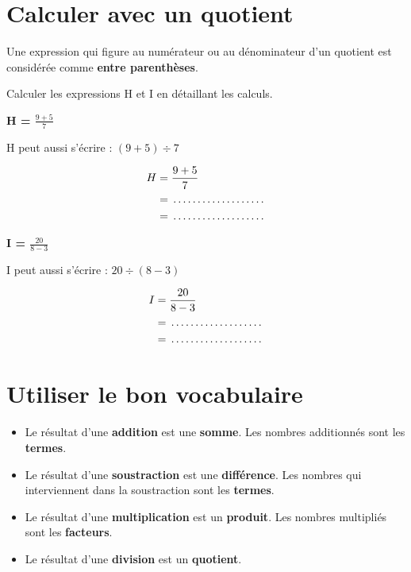 \newpage
\section{Calculer avec un quotient}
\raggedbottom
\begin{proprietebox}
Une expression qui figure au numérateur ou au dénominateur d'un quotient est considérée comme \textbf{entre parenthèses}.
\end{proprietebox}

\begin{examplebox}
Calculer les expressions H et I en détaillant les calculs.

\begin{minipage}{0.48\textwidth}
\textbf{H = $\frac{9 + 5}{7}$}

H peut aussi s'écrire : $(9 + 5) \div 7$

\begin{align*}
H &= \frac{9 + 5}{7} \\
&= \trous{3cm} \\
&= \trous{3cm}
\end{align*}
\end{minipage}
\hfill
\begin{minipage}{0.48\textwidth}
\textbf{I = $\frac{20}{8 - 3}$}

I peut aussi s'écrire : $20 \div (8 - 3)$

\begin{align*}
I &= \frac{20}{8 - 3} \\
&= \trous{3cm} \\
&= \trous{3cm}
\end{align*}
\end{minipage}
\end{examplebox}

\section{Utiliser le bon vocabulaire}
\begin{definitionbox}
\begin{itemize}[label = \textbullet]
\item Le résultat d'une \textbf{addition} est une \textbf{somme}. Les nombres additionnés sont les \textbf{termes}.
\item Le résultat d'une \textbf{soustraction} est une \textbf{différence}. Les nombres qui interviennent dans la soustraction sont les \textbf{termes}.
\item Le résultat d'une \textbf{multiplication} est un \textbf{produit}. Les nombres multipliés sont les \textbf{facteurs}.
\item Le résultat d'une \textbf{division} est un \textbf{quotient}.
\end{itemize}
\end{definitionbox}

